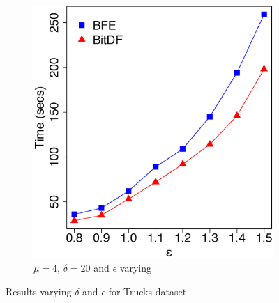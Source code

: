\begin{figure}[h!]
\begin{subfigure}[t]{0.48\textwidth}
        \includegraphics[width=\textwidth]{images/Trucks_n_4_l_20_varying_g.eps}
        \caption{$\mu = 4$, $\delta = 20$ and $\epsilon$ varying}
        \label{fig:trucks_vary_g}
    \end{subfigure}
    \caption{Results varying $\delta$ and $\epsilon$ for Trucks dataset}
    \label{fig:trucks_results}
\end{figure}

